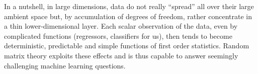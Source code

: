 \documentclass[MAL,biber]{nowfnt} %
\newcommand{\RED}{\color[rgb]{0.70,0,0}}
\newcommand{\T}{{\sf T}}
\newcommand{\asto}{{ \xrightarrow{a.s.} }}
\newcommand{\A}{{\mathbf{A}}}
\newcommand{\E}{{\mathbf{E}}}
\newcommand{\J}{{\mathbf{J}}}
\newcommand{\K}{{\mathbf{K}}}
\newcommand{\Z}{{\mathbf{Z}}}
\renewcommand{\j}{{\mathbf{j}}}
\newcommand{\x}{{\mathbf{x}}}
\newcommand{\z}{{\mathbf{z}}}
\newcommand{\bmu}{{ \boldsymbol{\mu} }}
\newcommand{\RR}{{\mathbb{R}}}
\begin{document}
In a nutshell, in large dimensions, data do not really ``spread'' all over their large ambient space but, by accumulation of degrees of freedom, rather concentrate in a thin lower-dimensional layer. Each scalar observation of the data, even by complicated functions (regressors, classifiers for us), then tends to become deterministic, predictable and simple functions of first order statistics. Random matrix theory exploits these effects and is thus capable to answer seemingly challenging machine learning questions.






\end{document}

